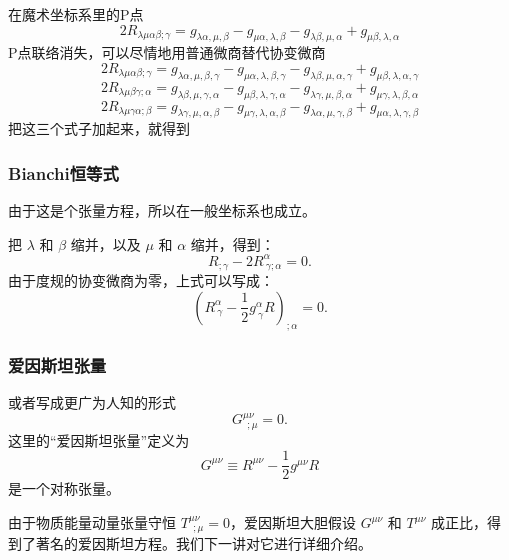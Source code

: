 \documentclass[CJK,13pt]{beamer}
\begin{document}
  \begin{frame}
    在魔术坐标系里的P点
    $$2R_{\lambda\mu\alpha\beta;\gamma}  =g_{\lambda\alpha,\mu,\beta}  -g_{\mu\alpha,\lambda,\beta}-g_{\lambda\beta,\mu,\alpha}+g_{\mu\beta,\lambda,\alpha} $$      
    P点联络消失，可以尽情地用普通微商替代协变微商
    $$ 2R_{\lambda\mu\alpha\beta;\gamma} = g_{\lambda\alpha,\mu,\beta,\gamma}  -g_{\mu\alpha,\lambda,\beta,\gamma}-g_{\lambda\beta,\mu,\alpha,\gamma}+g_{\mu\beta,\lambda,\alpha,\gamma}$$
    $$ 2R_{\lambda\mu\beta\gamma;\alpha} = g_{\lambda\beta,\mu,\gamma,\alpha}  -g_{\mu\beta,\lambda,\gamma,\alpha}-g_{\lambda\gamma,\mu,\beta,\alpha}+g_{\mu\gamma,\lambda,\beta,\alpha}$$    
    $$ 2R_{\lambda\mu\gamma\alpha;\beta} = g_{\lambda\gamma,\mu,\alpha,\beta}  -g_{\mu\gamma,\lambda,\alpha,\beta}-g_{\lambda\alpha,\mu,\gamma,\beta}+g_{\mu\alpha,\lambda,\gamma,\beta}$$    
    把这三个式子加起来，就得到
  \end{frame}


  \begin{frame}
    \frametitle{Bianchi恒等式}
    由于这是个张量方程，所以在一般坐标系也成立。
    
    把 $\lambda$ 和 $\beta$ 缩并，以及 $\mu$ 和 $\alpha$ 缩并，得到：
    $$ R_{;\gamma} - 2R^\alpha_{\ \gamma;\alpha} = 0.$$
    由于度规的协变微商为零，上式可以写成：
    $$ \left(R^\alpha_{\ \gamma}-\frac{1}{2}g^\alpha_{\ \gamma}R\right)_{;\alpha} = 0.$$    
  \end{frame}


  \begin{frame}
    \frametitle{爱因斯坦张量}
    或者写成更广为人知的形式
    {\blue $$ G^{\mu\nu}_{\ \ ;\mu} = 0.$$}    
    这里的“爱因斯坦张量”定义为
    {\blue $$ G^{\mu\nu} \equiv R^{\mu\nu}-\frac{1}{2}g^{\mu\nu}R$$}
    是一个对称张量。

    由于物质能量动量张量守恒 $T^{\mu\nu}_{\ \ ;\mu}=0$，爱因斯坦大胆假设 $G^{\mu\nu}$ 和 $T^{\mu\nu}$ 成正比，得到了著名的爱因斯坦方程。我们下一讲对它进行详细介绍。
  \end{frame}
  
\ech
\end{document}
